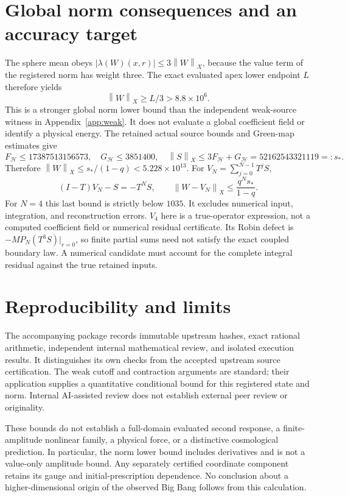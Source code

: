 \documentclass[11pt]{article}
\newcommand{\HH}{\mathcal H}
\newcommand{\norm}[1]{\left\lVert#1\right\rVert}
\begin{document}
\section{Global norm consequences and an accuracy target}
The sphere mean obeys $|\lambda(W)(x,r)|\le3\norm{W}_X$, because the
value term of the registered norm has weight three. The exact evaluated apex
lower endpoint $L$ therefore yields
\[
 \norm{W}_X\ge L/3>8.8\times10^6.
\]
This is a stronger global norm lower bound than the independent weak-source
witness in Appendix~\ref{app:weak}. It does not evaluate a global coefficient
field or identify a physical energy.
The retained actual source bounds and Green-map estimates give
\[
 F_{\HH}\le17387513156573,\quad G_{\HH}\le3851400,
 \quad\norm{S}_X\le3F_{\HH}+G_{\HH}=52162543321119=:s_*.
\]
Therefore $\norm{W}_X\le s_* /(1-q)<5.228\times10^{13}$.
For $V_N=\sum_{j=0}^{N-1}T^jS$,
\[
 (I-T)V_N-S=-T^NS,\qquad
 \norm{W-V_N}_X\le\frac{q^Ns_*}{1-q}.
\]
For $N=4$ this last bound is strictly below $1035$. It excludes numerical
input, integration, and reconstruction errors. $V_4$ here is a true-operator
expression, not a computed coefficient field or numerical residual certificate.
Its Robin defect is $-MP_N(T^3S)|_{r=0}$, so finite partial sums need not
satisfy the exact coupled boundary law. A numerical candidate must account for
the complete integral residual against the true retained inputs.

\section{Reproducibility and limits}
The accompanying package records immutable upstream hashes, exact rational
arithmetic, independent internal mathematical review, and isolated execution
results. It distinguishes its own checks from the accepted upstream source
certification. The weak cutoff and contraction arguments are standard; their
application supplies a quantitative conditional bound for this registered
state and norm. Internal AI-assisted review does not establish external peer
review or originality.

These bounds do not establish a full-domain evaluated second response, a
finite-amplitude nonlinear family, a physical force, or a distinctive
cosmological prediction. In particular, the norm lower bound includes
derivatives and is not a value-only amplitude bound. Any separately certified
coordinate component retains its gauge and initial-prescription dependence.
No conclusion about a higher-dimensional origin of the observed Big Bang
follows from this calculation.
\end{document}
